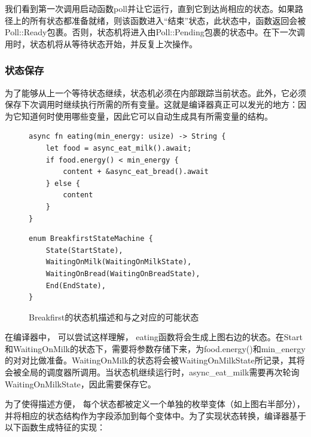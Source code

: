 我们看到第一次调用启动函数poll并让它运行，直到它到达尚相应的状态。如果路径上的所有状态都准备就绪，则该函数进入“结束”状态，此状态中，函数返回会被 Poll::Ready包裹。否则，状态机将进入由Poll::Pending包裹的状态中。在下一次调用时，状态机将从等待状态开始，并反复上次操作。


\subsubsection{状态保存}

为了能够从上一个等待状态继续，状态机必须在内部跟踪当前状态。此外，它必须保存下次调用时继续执行所需的所有变量。这就是编译器真正可以发光的地方：因为它知道何时使用哪些变量，因此它可以自动生成具有所需变量的结构。

\begin{figure}[htbp]
    \figureCapSet
	\centering
	\begin{minipage}{0.49\linewidth}%
		\centering
        \begin{lstlisting}[frame=none]
async fn eating(min_energy: usize) -> String {
    let food = async_eat_milk().await;
    if food.energy() < min_energy {
        content + &async_eat_bread().await
    } else {
        content
    }
}
        \end{lstlisting}
	\end{minipage}
    \hfill
	\begin{minipage}{0.49\linewidth}
		\centering
        \begin{lstlisting}[frame=none]
enum BreakfirstStateMachine {
    State(StartState),
    WaitingOnMilk(WaitingOnMilkState),
    WaitingOnBread(WaitingOnBreadState),
    End(EndState),
}
        \end{lstlisting}
	\end{minipage}
    \caption{Breakfirst的状态机描述和与之对应的可能状态}
\end{figure}


在编译器中， 可以尝试这样理解， eating函数将会生成上图右边的状态。在Start和WaitingOnMilk的状态下，需要将参数存储下来，为food.energy()和min\_energy的对对比做准备。WaitingOnMilk的状态将会被WaitingOnMilkState所记录，其将会被全局的调度器所调用。当状态机继续运行时，async\_eat\_milk需要再次轮询WaitingOnMilkState，因此需要保存它。

为了使得描述方便， 每个状态都被定义一个单独的枚举变体（如上图右半部分），并将相应的状态结构作为字段添加到每个变体中。为了实现状态转换，编译器基于以下函数生成特征的实现：

